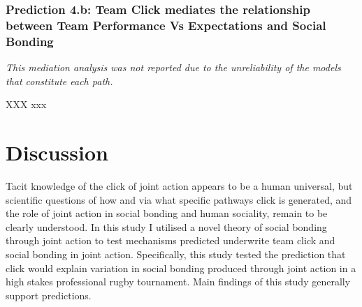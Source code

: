 \begin{CJK}{UTF8}{gbsn}
\subsubsection{Prediction 4.b: Team Click mediates the relationship between Team Performance Vs Expectations and Social Bonding}

\textit{This mediation analysis was not reported due to the unreliability of the models that constitute each path.}






















































XXX
xxx


\clearpage

\section{Discussion}

Tacit knowledge of the click of joint action appears to be a human universal, but scientific questions of how and via what specific pathways click is generated, and the role of joint action in social bonding and human sociality, remain to be clearly understood.  In this study I utilised a novel theory of social bonding through joint action to test mechanisms predicted underwrite team click and social bonding in joint action.  Specifically, this study tested the prediction that click would explain variation in social bonding produced through joint action in a high stakes professional rugby tournament. Main findings of this study generally support predictions.



\end{CJK}
